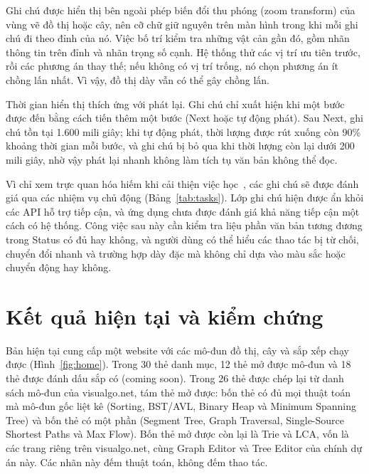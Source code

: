 \documentclass[11pt,a4paper]{article}
\begin{document}
Ghi chú được hiển thị bên ngoài phép biến đổi thu phóng (zoom transform) của vùng vẽ đồ thị hoặc cây, nên cỡ chữ giữ nguyên trên màn hình trong khi mỗi ghi chú đi theo đỉnh của nó. Việc bố trí kiểm tra những vật cản gần đó, gồm nhãn thông tin trên đỉnh và nhãn trọng số cạnh. Hệ thống thử các vị trí ưu tiên trước, rồi các phương án thay thế; nếu không có vị trí trống, nó chọn phương án ít chồng lấn nhất. Vì vậy, đồ thị dày vẫn có thể gây chồng lấn.

Thời gian hiển thị thích ứng với phát lại. Ghi chú chỉ xuất hiện khi một bước được đến bằng cách tiến thêm một bước (Next hoặc tự động phát). Sau Next, ghi chú tồn tại 1.600 mili giây; khi tự động phát, thời lượng được rút xuống còn 90\% khoảng thời gian mỗi bước, và ghi chú bị bỏ qua khi thời lượng còn lại dưới 200 mili giây, nhờ vậy phát lại nhanh không làm tích tụ văn bản không thể đọc.

Vì chỉ xem trực quan hóa hiếm khi cải thiện việc học~\cite{hundhausen2002}, các ghi chú sẽ được đánh giá qua các nhiệm vụ chủ động (Bảng~\ref{tab:tasks}). Lớp ghi chú hiện được ẩn khỏi các API hỗ trợ tiếp cận, và ứng dụng chưa được đánh giá khả năng tiếp cận một cách có hệ thống. Công việc sau này cần kiểm tra liệu phần văn bản tương đương trong Status có đủ hay không, và người dùng có thể hiểu các thao tác bị từ chối, chuyển đổi nhanh và trường hợp dày đặc mà không chỉ dựa vào màu sắc hoặc chuyển động hay không.

\nextsection
\section{Kết quả hiện tại và kiểm chứng}\label{sec:results}
Bản hiện tại cung cấp một website với các mô-đun đồ thị, cây và sắp xếp chạy được (Hình~\ref{fig:home}). Trong 30 thẻ danh mục, 12 thẻ mở được mô-đun và 18 thẻ được đánh dấu sắp có (coming soon). Trong 26 thẻ được chép lại từ danh sách mô-đun của visualgo.net, tám thẻ mở được: bốn thẻ có đủ mọi thuật toán mà mô-đun gốc liệt kê (Sorting, BST/AVL, Binary Heap và Minimum Spanning Tree) và bốn thẻ có một phần (Segment Tree, Graph Traversal, Single-Source Shortest Paths và Max Flow). Bốn thẻ mở được còn lại là Trie và LCA, vốn là các trang riêng trên visualgo.net, cùng Graph Editor và Tree Editor của chính dự án này. Các nhãn này đếm thuật toán, không đếm thao tác.
\end{document}
